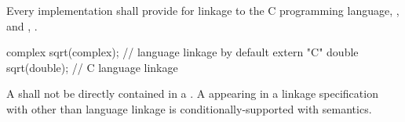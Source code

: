 \pnum
{}%
Every implementation shall provide for linkage to the C programming language,
%
, and \Cpp{}, .
\begin{example}
\begin{codeblock}
complex sqrt(complex);          // \Cpp{} language linkage by default
extern "C" {
  double sqrt(double);          // C language linkage
}
\end{codeblock}
\end{example}

\pnum
A 
shall not be directly contained in
a .
A  appearing in
a linkage specification with other than \Cpp{} language linkage
is conditionally-supported with
 semantics.

